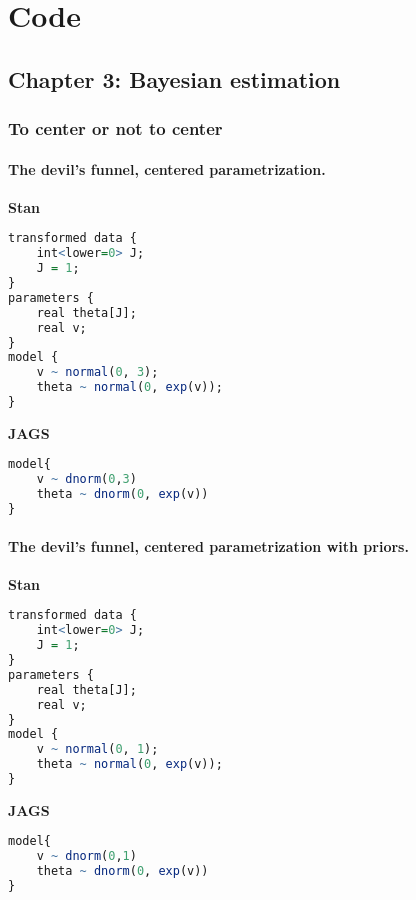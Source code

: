 \chapter{Code} \label{appC:additional}


\section{Chapter 3: Bayesian estimation} \label{appC1:chapter3}

\subsection{To center or not to center} \label{appC1_1:noncenter}

\subsubsection{The devil's funnel, centered parametrization.} 

\noindent \textbf{Stan}
%
\begin{lstlisting}[language=R]
transformed data {
	int<lower=0> J;
	J = 1;
}
parameters {
	real theta[J];
	real v;
}
model {
	v ~ normal(0, 3);
	theta ~ normal(0, exp(v));
}
\end{lstlisting}


\noindent \textbf{JAGS}
%
\begin{lstlisting}[language=R]
model{
	v ~ dnorm(0,3)
	theta ~ dnorm(0, exp(v))
}
\end{lstlisting}




\subsubsection{The devil's funnel, centered parametrization with priors.} 

\noindent \textbf{Stan}
%
\begin{lstlisting}[language=R]
transformed data {
	int<lower=0> J;
	J = 1;
}
parameters {
	real theta[J];
	real v;
}
model {
	v ~ normal(0, 1);
	theta ~ normal(0, exp(v));
}
\end{lstlisting}


\noindent \textbf{JAGS}
%
\begin{lstlisting}[language=R]
model{
	v ~ dnorm(0,1)
	theta ~ dnorm(0, exp(v))
}
\end{lstlisting}



